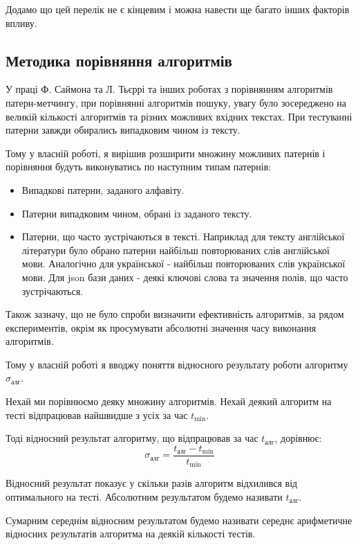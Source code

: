 \documentclass[a4paper,14pt]{extarticle} %
\begin{document}
	Додамо що цей перелік не є кінцевим і можна навести ще багато інших факторів впливу.

	\subsection{Методика порівняння алгоритмів}\label{methodic}

	У праці Ф. Саймона та Л. Тьєррі \cite{experiment} та інших роботах з порівнянням алгоритмів патерн-метчингу, при порівнянні алгоритмів пошуку, увагу було зосереджено на великій кількості алгоритмів та різних можливих вхідних текстах.
	При тестуванні патерни завжди обирались випадковим чином із тексту.

	Тому у власній роботі, я вирішив розширити множину можливих патернів і порівняння будуть виконуватись по наступним типам патернів:
	\begin{itemize}
		\item Випадкові патерни, заданого алфавіту.
		\item Патерни випадковим чином, обрані із заданого тексту.
		\item Патерни, що часто зустрічаються в тексті. Наприклад для тексту англійської літератури було обрано патерни найбільш повторюваних слів англійської мови. Аналогічно для української - найбільш повторюваних слів української мови. Для json бази даних - деякі ключові слова та значення полів, що часто зустрічаються.
	\end {itemize}

	Також зазначу, що не було спроби визначити ефективність алгоритмів, за рядом експериментів, окрім як просумувати абсолютні значення часу виконання алгоритмів.

	Тому у власній роботі я вводжу поняття відносного результату роботи алгоритму $\sigma_{\text{алг}}$.

	Нехай ми порівнюємо деяку множину алгоритмів. Нехай деякий алгоритм на тесті відпрацював найшвидше з усіх за час $t_{\text{min}}$.

	Тоді відносний результат алгоритму, що відпрацював за час $t_{\text{алг}}$, дорівнює:
	$$\sigma_{\text{алг}} = \frac{t_{\text{алг}}-t_{\text{min}}}{t_{\text{min}}}$$
    
	Відносний результат показує у скільки разів алгоритм відхилився від оптимального на тесті. Абсолютним результатом будемо називати $t_{\text{алг}}$.
	
	Сумарним середнім відносним результатом будемо називати середнє арифметичне відносних результатів алгоритма на деякій кількості тестів.
	
\end{document}
